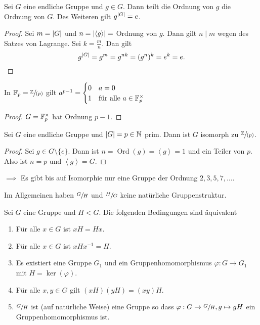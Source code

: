 \begin{corollary}
	Sei $G$ eine endliche Gruppe und $g \in G$. Dann teilt die Ordnung von $g$ die Ordnung von $G$.
	Des Weiteren gilt $g^{\abs{G}} = e$.
\end{corollary}

\begin{proof}
	Sei $m = \abs{G}$ und $n = \abs{\left< g \right>} =$ Ordnung von $g$.
	Dann gilt $n \mid m$ wegen des Satzes von Lagrange.
	Sei $k = \frac{m}{n}$. Dan gilt
	\[
		g^{\abs{G}} = g^{m} = g^{nk} = (g^{n})^{k} = e^{k} = e
	.\] 
\end{proof}

\begin{corollary}
	In $\mathbb{F}_{p} = \sfrac{\mathbb{Z}}{(p)}$ gilt $a^{p-1} = \begin{cases}
		0 &a = 0\\
		1 &\text{für alle } a \in \mathbb{F}_{p}^{\times}
	\end{cases}$
\end{corollary}

\begin{proof}
	$G = \mathbb{F}_{p}^{\times }$ hat Ordnung $p-1$.
\end{proof}

\begin{corollary}
	Sei $G$ eine endliche Gruppe und $\abs{G} = p \in \mathbb{N}$ prim. Dann ist $G$ isomorph zu $\sfrac{\mathbb{Z}}{(p)}$.
\end{corollary}

\begin{proof}
	Sei $g \in G \setminus \{e\} $. Dann ist $n = \operatorname{Ord}(g) = \left< g \right> = 1$ und ein Teiler von $p$.
	Also ist $n = p$ und $\left< g \right> = G$.
\end{proof}

$\implies$ Es gibt bis auf Isomorphie nur eine Gruppe der Ordnung $2,3,5,7,\ldots$.

Im Allgemeinen haben $\sfrac{G}{H}$ und $\sfrac{H}{G}$ keine natürliche Gruppenstruktur.

\begin{theorem}
	Sei $G$ eine Gruppe und $H < G$. Die folgenden Bedingungen sind äquivalent
	\begin{enumerate}[(1)]
		\item Für alle $x \in G$ ist $x H = H x$.
		\item Für alle  $x \in G$ ist $x H x^{-1} = H$.
		\item Es existiert eine Gruppe $G_1$ und ein Gruppenhomomorphismus $\varphi: G \to G_1$ mit $H = \ker(\varphi)$.
		\item Für alle $x,y \in G$ gilt $(xH)(yH) = (xy) H$.
		\item $\sfrac{G}{H}$ ist (auf natürliche Weise) eine Gruppe so dass $\varphi: G \to \sfrac{G}{H}, g \mapsto g H$ ein Gruppenhomomorphismus ist.
	\end{enumerate}
\end{theorem}

